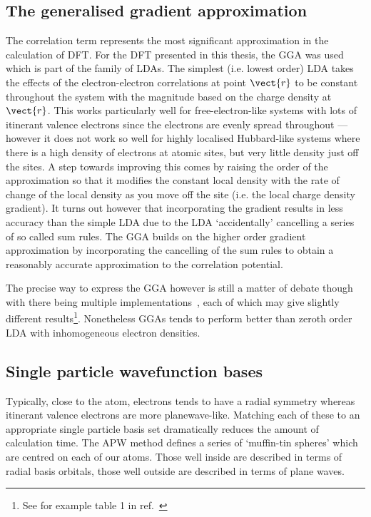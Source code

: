\subsection{The generalised gradient approximation}

The correlation term represents the most significant approximation in the calculation of \ac{DFT}. For the \ac{DFT} presented in this thesis, the \ac{GGA} was used which is part of the family of \acp{LDA}. The simplest (i.e. lowest order) \ac{LDA} takes the effects of the electron-electron correlations at point $\vect{r}$ to be constant throughout the system with the magnitude based on the charge density at $\vect{r}$. This works particularly well for free-electron-like systems with lots of itinerant valence electrons since the electrons are evenly spread throughout --- however it does not work so well for highly localised Hubbard-like systems where there is a high density of electrons at atomic sites, but very little density just off the sites. A step towards improving this comes by raising the order of the approximation so that it modifies the constant local density with the rate of change of the local density as you move off the site (i.e. the local charge density gradient). It turns out however that incorporating the gradient results in less accuracy than the simple \ac{LDA} due to the \ac{LDA} `accidentally' cancelling a series of so called sum rules. The \ac{GGA} builds on the higher order gradient approximation by incorporating the cancelling of the sum rules to obtain a reasonably accurate approximation to the correlation potential. 

The precise way to express the \ac{GGA} however is still a matter of debate though with there being multiple implementations~\cite{Perdew1996, Perdew1986}, each of which may give slightly different results\footnote{See for example table 1 in ref.~\cite{Perdew1996}}. Nonetheless \acp{GGA} tends to perform better than zeroth order \ac{LDA} with inhomogeneous electron densities.

\subsection{Single particle wavefunction bases}

Typically, close to the atom, electrons tends to have a radial symmetry whereas itinerant valence electrons are more planewave-like. Matching each of these to an appropriate single particle basis set dramatically reduces the amount of calculation time. The \ac{APW} method defines a series of `muffin-tin spheres' which are centred on each of our atoms. Those well inside are described in terms of radial basis orbitals, those well outside are described in terms of plane waves.

